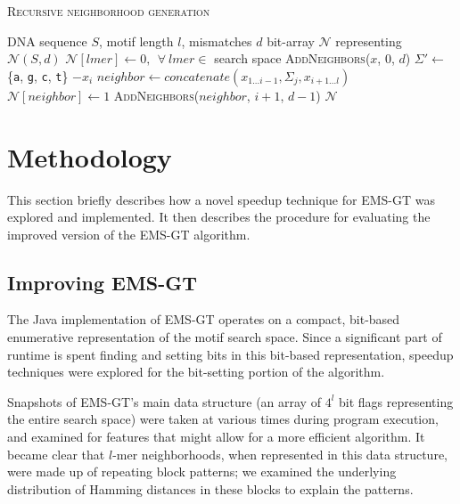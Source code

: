 \documentclass[oneside,12pt]{DISCSthesis}
\begin{document}
{		{
			\noindent \hspace*{6pt}{\bf Algorithm 2.3} \textsc{Recursive neighborhood generation}\small
			\begin{algorithmic}[1]
				\label{alg:recursive-nbr-gen}
				\Require DNA sequence $S$, motif length $l$, mismatches $d$
				\Ensure bit-array $\mathcal{N}$ representing $\mathcal{N}(S,d)$ \vspace*{6pt}
				\State $\mathcal{N}[lmer] \leftarrow 0,\ \ \forall\ lmer \in $ search space 
				\State \textsc{AddNeighbors}($x$, 0, $d$) \hspace*{79pt}
				\EndFor
				\newline
				\State {}
						\State $\Sigma' \leftarrow$ \{\texttt{a}, \texttt{g}, \texttt{c}, \texttt{t}\} $- x_{i}$ \hspace*{79pt}
							\State $neighbor \leftarrow concatenate(x_{1...i-1},\Sigma_{j},x_{i+1...l})$
							\State $\mathcal{N}[neighbor] \leftarrow 1$
								\State \textsc{AddNeighbors}($neighbor$, $i+1$, $d-1$)
							\EndIf
						\EndFor
					\EndFor
				\EndProcedure
				\State\Return $\mathcal{N}$
				\end{algorithmic}
			}

\chapter{Methodology}
	This section briefly describes how a novel speedup technique for EMS-GT was explored and implemented.
	It then describes the procedure for evaluating the improved version of the EMS-GT algorithm.

	\section{Improving EMS-GT}
		The Java implementation of EMS-GT operates on a compact, bit-based enumerative representation of the motif search space. Since a significant part of runtime is spent finding and setting bits in this bit-based representation, speedup techniques were explored for the bit-setting portion of the algorithm.

		Snapshots of EMS-GT's main data structure (an array of $4^l$ bit flags representing the entire search space) were taken at various times during program execution, and examined for features that might allow for a more efficient algorithm. It became clear that $l$-mer neighborhoods, when represented in this data structure, were made up of repeating block patterns; we examined the underlying distribution of Hamming distances in these blocks to explain the patterns.

}
\end{document}
